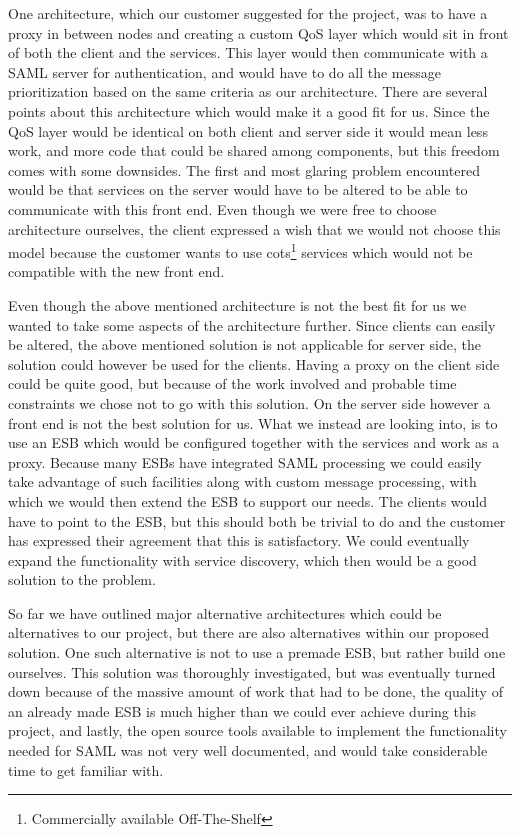         One architecture, which our customer suggested for the project, was to have a proxy in between nodes and creating a custom QoS layer which would sit in front of both the client and the services. This layer would then communicate with a SAML server for authentication, and would have to do all the message prioritization based on the same criteria as our architecture. There are several points about this architecture which would make it a good fit for us. Since the QoS layer would be identical on both client and server side it would mean less work, and more code that could be shared among components, but this freedom comes with some downsides. The first and most glaring problem encountered would be that services on the server would have to be altered to be able to communicate with this front end. Even though we were free to choose architecture ourselves, the client expressed a wish that we would not choose this model because the customer wants to use \gls{cots}\footnote{Commercially available Off-The-Shelf} services which would not be compatible with the new front end.

        Even though the above mentioned architecture is not the best fit for us we wanted to take some aspects of the architecture further. Since clients can easily be altered, the above mentioned solution is not applicable for server side, the solution could however be used for the clients. Having a proxy on the client side could be quite good, but because of the work involved and probable time constraints we chose not to go with this solution. On the server side however a front end is not the best solution for us. What we instead are looking into, is to use an ESB which would be configured together with the services and work as a proxy. Because many ESBs have integrated SAML processing we could easily take advantage of such facilities along with custom message processing, with which we would then extend the ESB to support our needs. The clients would have to point to the ESB, but this should both be trivial to do and the customer has expressed their agreement that this is satisfactory. We could eventually expand the functionality with service discovery, which then would be a good solution to the problem.

        So far we have outlined major alternative architectures which could be alternatives to our project, but there are also alternatives within our proposed solution. One such alternative is not to use a premade ESB, but rather build one ourselves. This solution was thoroughly investigated, but was eventually turned down because of the massive amount of work that had to be done, the quality of an already made ESB is much higher than we could ever achieve during this project, and lastly, the open source tools available to implement the functionality needed for SAML was not very well documented, and would take considerable time to get familiar with.

